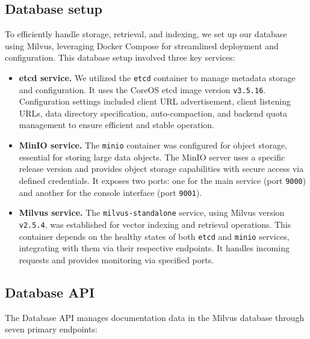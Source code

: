 \subsection{Database setup}

To efficiently handle storage, retrieval, and indexing, we set up our database using Milvus, leveraging Docker Compose for streamlined deployment and configuration. This database setup involved three key services:

\begin{itemize}
	\item \textbf{etcd service.}
	We utilized the \texttt{etcd} container to manage metadata storage and configuration. It uses the CoreOS etcd image version \texttt{v3.5.16}. Configuration settings included client URL advertisement, client listening URLs, data directory specification, auto-compaction, and backend quota management to ensure efficient and stable operation.
	
	\item \textbf{MinIO service.}
	The \texttt{minio} container was configured for object storage, essential for storing large data objects. The MinIO server uses a specific release version and provides object storage capabilities with secure access via defined credentials. It exposes two ports: one for the main service (port \texttt{9000}) and another for the console interface (port \texttt{9001}).
	
	\item \textbf{Milvus service.}
	The \texttt{milvus-standalone} service, using Milvus version \texttt{v2.5.4}, was established for vector indexing and retrieval operations. This container depends on the healthy states of both \texttt{etcd} and \texttt{minio} services, integrating with them via their respective endpoints. It handles incoming requests and provides monitoring via specified ports.
\end{itemize}

\subsection{Database API}

The Database API manages documentation data in the Milvus database through seven primary endpoints:


